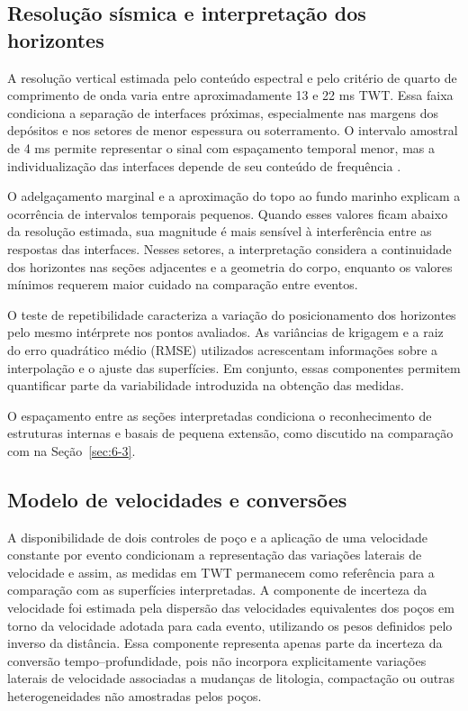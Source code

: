 \subsection{Resolução sísmica e interpretação dos horizontes}\label{sec:6-10-1}

A resolução vertical estimada pelo conteúdo espectral e pelo critério de quarto de comprimento de onda varia entre aproximadamente 13 e 22 ms TWT. Essa faixa condiciona a separação de interfaces próximas, especialmente nas margens dos depósitos e nos setores de menor espessura ou soterramento. O intervalo amostral de 4 ms permite representar o sinal com espaçamento temporal menor, mas a individualização das interfaces depende de seu conteúdo de frequência \cite{kallweit1982}.

O adelgaçamento marginal e a aproximação do topo ao fundo marinho explicam a ocorrência de intervalos temporais pequenos. Quando esses valores ficam abaixo da resolução estimada, sua magnitude é mais sensível à interferência entre as respostas das interfaces. Nesses setores, a interpretação considera a continuidade dos horizontes nas seções adjacentes e a geometria do corpo, enquanto os valores mínimos requerem maior cuidado na comparação entre eventos.

O teste de repetibilidade caracteriza a variação do posicionamento dos horizontes pelo mesmo intérprete nos pontos avaliados. As variâncias de krigagem e a raiz do erro quadrático médio (RMSE) utilizados acrescentam informações sobre a interpolação e o ajuste das superfícies. Em conjunto, essas componentes permitem quantificar parte da variabilidade introduzida na obtenção das medidas.

O espaçamento entre as seções interpretadas condiciona o reconhecimento de estruturas internas e basais de pequena extensão, como discutido na comparação com  na Seção~\ref{sec:6-3}.

\subsection{Modelo de velocidades e conversões}\label{sec:6-10-2}

A disponibilidade de dois controles de poço e a aplicação de uma velocidade constante por evento condicionam a representação das variações laterais de velocidade e assim, as medidas em TWT permanecem como referência para a comparação com as superfícies interpretadas. A componente de incerteza da velocidade foi estimada pela dispersão das velocidades equivalentes dos poços em torno da velocidade adotada para cada evento, utilizando os pesos definidos pelo inverso da distância. Essa componente representa apenas parte da incerteza da conversão tempo--profundidade, pois não incorpora explicitamente variações laterais de velocidade associadas a mudanças de litologia, compactação ou outras heterogeneidades não amostradas pelos poços.

